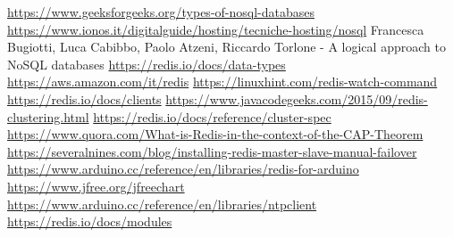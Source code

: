 \begin{thebibliography}{2}
   \url{https://www.geeksforgeeks.org/types-of-nosql-databases}
  \url{https://www.ionos.it/digitalguide/hosting/tecniche-hosting/nosql}
   Francesca Bugiotti, Luca Cabibbo, Paolo Atzeni, Riccardo Torlone - A logical approach to NoSQL databases
   \url{https://redis.io/docs/data-types}
  \url{https://aws.amazon.com/it/redis}
  \url{https://linuxhint.com/redis-watch-command}
   \url{https://redis.io/docs/clients}
  \url{https://www.javacodegeeks.com/2015/09/redis-clustering.html}
   \url{https://redis.io/docs/reference/cluster-spec}
  \url{https://www.quora.com/What-is-Redis-in-the-context-of-the-CAP-Theorem}
  \url{https://severalnines.com/blog/installing-redis-master-slave-manual-failover}
   \url{https://www.arduino.cc/reference/en/libraries/redis-for-arduino}
   \url{https://www.jfree.org/jfreechart}
   \url{https://www.arduino.cc/reference/en/libraries/ntpclient}
   \url{https://redis.io/docs/modules}
\end{thebibliography}


